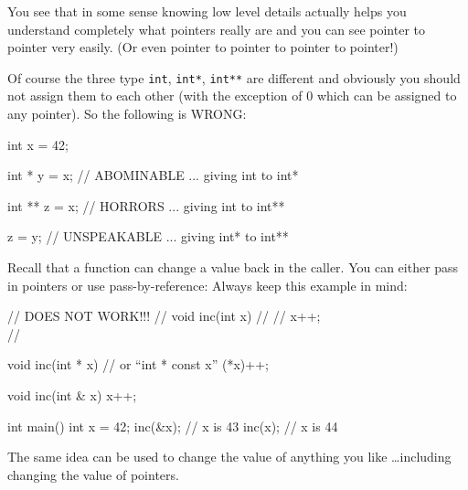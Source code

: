 You see that in some sense knowing low level details actually helps you understand completely what pointers really are and you can see pointer to pointer very easily. (Or even pointer to pointer to pointer to pointer!)

Of course the three type \texttt{int}, \texttt{int*}, \texttt{int**} are different and obviously you should not assign them to each other (with the exception of 0 which can be assigned to any pointer). So the following is WRONG:

\begin{consolethree}[escapeinside=||]
int x = 42;

int * y = x;    // ABOMINABLE ... giving int to int*

int ** z = x;   // HORRORS ... giving int to int**

z = y;          // UNSPEAKABLE ... giving int* to int** 
\end{consolethree}













\newpage{}

Recall that a function can change a value back in the caller. You can either pass in pointers or use pass-by-reference: Always keep this example in mind:

\begin{consolethree}[escapeinside=||]
// DOES NOT WORK!!!
// void inc(int x)
// {
// x++;\\
// }

void inc(int * x) // or ``int * const x''
{
    (*x)++;
}

void inc(int & x)
{
    x++;
}

int main()
{
    int x = 42;
    inc(&x);    // x is 43
    inc(x);     // x is 44
}
\end{consolethree}
The same idea can be used to change the value of anything you like \ldots including changing the value of pointers.






